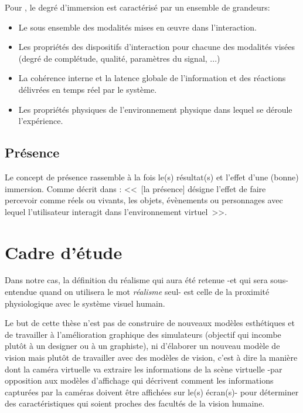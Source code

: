 	\par Pour \cite{burkhardt_conception_1999}, le degré d'immersion est caractérisé par un ensemble de grandeurs:
	\begin{itemize}
		\item Le sous ensemble des modalités mises en œuvre dans l'interaction.
		\item Les propriétés des dispositifs d'interaction pour chacune des modalités visées (degré de complétude, qualité, paramètres du signal, ...)
		\item La cohérence interne et la latence globale de l'information et des réactions délivrées en temps réel par le système.
		\item Les propriétés physiques de l'environnement physique dans lequel se déroule l'expérience.
	\end{itemize}
	
	\subsection{Présence}
	\par Le concept de présence rassemble à la fois le(s) résultat(s) et l'effet d'une (bonne) immersion. Comme décrit dans \citep{burkhardt_realite_2003}: <<~[la présence] désigne l'effet de faire percevoir comme réels ou vivants, les objets, évènements ou personnages avec lequel l'utilisateur interagit dans l'environnement virtuel~>>.
	
	\section{Cadre d'étude}
	\par Dans notre cas, la définition du réalisme qui aura été retenue -et qui sera sous-entendue quand on utilisera le mot \textit{réalisme} seul- est celle de la proximité physiologique avec le système visuel humain.
	
	\par Le but de cette thèse n'est pas de construire de nouveaux modèles esthétiques et de travailler à l'amélioration graphique des simulateurs (objectif qui incombe plutôt à un designer ou à un graphiste), ni d'élaborer un nouveau modèle de vision mais plutôt de travailler avec des modèles de vision, c'est à dire la manière dont la caméra virtuelle va extraire les informations de la scène virtuelle -par opposition aux modèles d'affichage qui décrivent comment les informations capturées par la caméras doivent être affichées sur le(s) écran(s)- pour déterminer des caractéristiques qui soient proches des facultés de la vision humaine.
	
